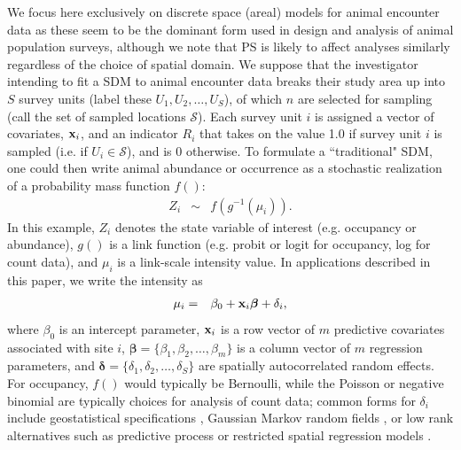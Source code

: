 \documentclass[times,mee,doublespace,]{besauth2}
\begin{document}
We focus here exclusively on discrete space (areal) models for animal encounter data as these seem to be the dominant form used in design and analysis of animal population surveys, although we note that PS is likely to affect analyses similarly regardless of the choice of spatial domain.  We suppose that the investigator intending to fit a SDM to animal encounter data breaks their study area up into $S$ survey units (label these $U_1, U_2, \hdots, U_S$), of which $n$ are selected for sampling (call the set of sampled locations $\mathcal{S}$). Each survey unit $i$ is assigned a vector of covariates, ${\bf x}_i$, and an indicator $R_i$ that takes on the value 1.0 if survey unit $i$ is sampled (i.e. if $U_i \in \mathcal{S}$), and is 0 otherwise.  To formulate a ``traditional" SDM, one could then write animal abundance or occurrence as a stochastic realization of a probability mass function $f()$:
\begin{eqnarray}
  \label{eq:process}
  Z_i & \sim & f(g^{-1}(\mu_i)).
\end{eqnarray}
In this example, $Z_i$ denotes the state variable of interest (e.g. occupancy or abundance), $g()$ is a link function (e.g. probit or logit for occupancy, log for count data), and $\mu_i$ is a link-scale intensity value.  In applications described in this paper, we write the intensity as
\begin{eqnarray}
\mu_i & = & \beta_0 + {\bf x}_i \boldsymbol{\beta}+\delta_i,
 \label{eq:mu}
\end{eqnarray}
where $\beta_0$ is an intercept parameter, ${\bf x}_i$ is a row vector of $m$ predictive covariates associated with site $i$, $\boldsymbol{\beta} = \{ \beta_1, \beta_2, \hdots, \beta_m \}$ is a column vector of $m$ regression parameters, and $\boldsymbol{\delta}=\{ \delta_1,\delta_2,\hdots,\delta_S \}$ are spatially autocorrelated random effects.  For occupancy, $f()$ would typically be Bernoulli, while the Poisson or negative binomial are typically choices for analysis of count data; common forms for $\delta_i$ include geostatistical specifications \citep{Cressie1993,DiggleEtAl1998}, Gaussian Markov random fields \citep[e.g. conditionally autoregressive models;][]{RueHeld2005}, or low rank alternatives such as predictive process \citep{BanerjeeEtAl2008,LatimerEtAl2009} or restricted spatial regression models \citep{Reich2006,Hughes2013}.
\end{document}
